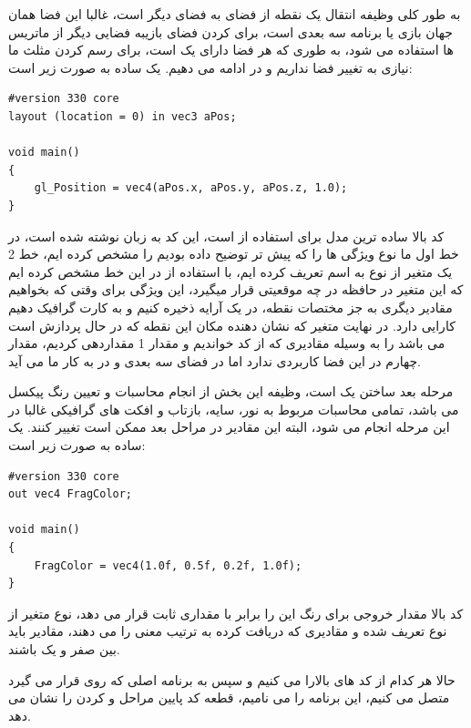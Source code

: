 \documentclass[a4paper, 12pt]{book}
\newcommand{\lrit}[1]{\lr{\textit{#1}}}
\begin{document}
    به طور کلی وظیفه \lrit{Vertex Shader} انتقال یک نقطه از فضای  به فضای دیگر است، غالبا این فضا همان جهان بازی یا برنامه سه بعدی است، برای  کردن فضای بازیبه فضایی دیگر از ماتریس ها استفاده می شود، به طوری که هر فضا دارای یک   است، برای رسم کردن مثلث ما نیازی به تغییر فضا نداریم و در  ادامه می دهیم.
    یک  ساده به صورت زیر است:

    \begin{LTR}
    \small
        \begin{lstlisting}[style=C++Style,caption=\lrit{basic vertex shader}]
#version 330 core
layout (location = 0) in vec3 aPos;

void main()
{
    gl_Position = vec4(aPos.x, aPos.y, aPos.z, 1.0);
}
        \end{lstlisting}
    \end{LTR}
    \normalsize
    \vspace*{0.3cm}

    کد بالا ساده ترین مدل برای استفاده از  است، این کد به زبان  نوشته شده است، در خط اول ما نوع ویژگی ها را که پیش تر توضیح داده بودیم
    را مشخص کرده ایم، خط 2 یک متغیر از نوع  به اسم  تعریف کرده ایم، با استفاده از \lrit{layout (location = 0)} در این خط مشخص کرده ایم که این متغیر در حافظه در چه موقعیتی قرار میگیرد، این ویژگی برای وقتی که بخواهیم مقادیر دیگری به جز مختصات نقطه، در یک آرایه ذخیره کنیم و به کارت گرافیک دهیم کارایی دارد.
    در نهایت متغیر  که نشان دهنده مکان این نقطه که در حال پردازش است می باشد را به وسیله مقادیری که از کد   خواندیم و مقدار 1 مقداردهی کردیم، مقدار چهارم در این فضا کاربردی ندارد اما در فضای سه بعدی و در  به کار ما می آید.\par
    مرحله بعد ساختن یک  است، وظیفه این بخش از  انجام محاسبات و تعیین رنگ پیکسل می باشد، تمامی محاسبات مربوط به نور، سایه، بازتاب و افکت های گرافیکی غالبا در این مرحله انجام می شود، البته این مقادیر در مراحل بعد ممکن است تغییر کنند.
    یک  ساده به صورت زیر است:

    \newpage
    \begin{LTR}
    \small
        \begin{lstlisting}[style=C++Style,caption=\lrit{basic fragment shader}]
#version 330 core
out vec4 FragColor;

void main()
{
    FragColor = vec4(1.0f, 0.5f, 0.2f, 1.0f);
}
        \end{lstlisting}
    \end{LTR}
    \normalsize
    \vspace*{0.3cm}
    کد بالا مقدار خروجی برای رنگ این  را برابر با مقداری ثابت قرار می دهد، نوع متغیر  از نوع  تعریف شده و مقادیری که دریافت کرده به ترتیب معنی  را می دهند، مقادیر باید بین صفر و یک باشند.\par
    حالا هر کدام از کد های بالارا  می کنیم و سپس به برنامه اصلی که روی  قرار می گیرد متصل می کنیم، این برنامه را  می نامیم، قطعه کد پایین مراحل  و  کردن  را نشان می دهد.
\end{document}
